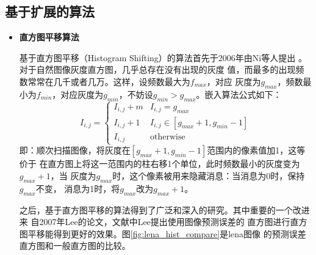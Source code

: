 \subsection{基于扩展的算法}
\begin{itemize}
  \setlength{\parindent}{2em}
  \vspace{-2mm}
  \item \textbf{直方图平移算法}
    \vspace{-2mm}
    \par
    基于直方图平移（Histogram Shifting）的算法首先于2006年由Ni等人提出
    \cite{ni2006reversible}。对于自然图像灰度直方图，几乎总存在没有出现的灰度
    值，而最多的出现频数常常在几千或者几万。这样，设频数最大为$f_{max}$，对应
    灰度为$g_{max}$，频数最小为$f_{min}$，对应灰度为$g_{min}$，不妨设$g_{min}>
    g_{max}$。嵌入算法公式如下：
    \begin{equation}
      \label{eq:histo_shift_embedding}
      I_{i,j}=\left\{ \begin{array}{ll}
        I_{i,j}+m & \textrm{$I_{i,j}=g_{max}$}\\
        I_{i,j}+1 & \textrm{$I_{i,j} \in [g_{max}+1,g_{min}-1]$}\\
        I_{i,j}   & \textrm{otherwise}
      \end{array} \right.
    \end{equation}
    即：顺次扫描图像，将灰度在$[g_{max}+1,g_{min}-1]$范围内的像素值加1，这等价于
    在直方图上将这一范围内的柱右移1个单位，此时频数最小的灰度变为$g_{max}+1$，当
    灰度为$g_{max}$时，这个像素被用来隐藏消息：当消息为0时，保持$g_{max}$不变，
    消息为1时，将$g_{max}$改为$g_{max}+1$。
    \par
    之后，基于直方图平移的算法得到了广泛和深入的研究。其中重要的一个改进来
    自2007年Lee的论文\cite{lee2006reversiblee}，文献中Lee提出使用图像预测误差的
    直方图进行直方图平移能得到更好的效果。图\ref{fig:lena_hist_compare}是lena图像
    的预测误差直方图和一般直方图的比较。
    \begin{figure}[!hbt]
    \centering 
\end{figure}
\end{itemize}
